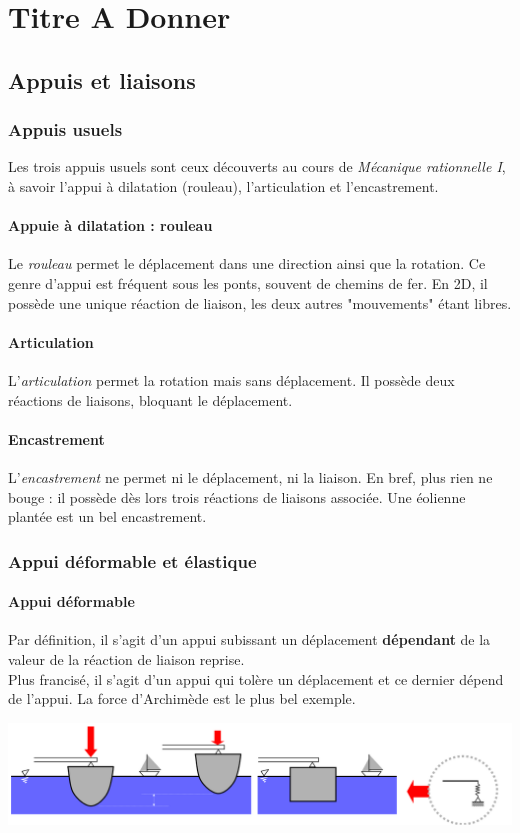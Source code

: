 \chapter{Titre  A Donner}
\section{Appuis et liaisons}
	\subsection{Appuis usuels}
	Les trois appuis usuels sont ceux découverts au cours de \textit{Mécanique 
	rationnelle I}, à savoir l'appui à dilatation (rouleau), l'articulation et 
	l'encastrement.
	
		\subsubsection{Appuie à dilatation : rouleau}
		Le \textit{rouleau} permet le déplacement dans une direction ainsi que 
		la rotation. Ce genre d'appui est fréquent sous les ponts, souvent de 
		chemins de fer. En 2D, il possède une unique réaction de liaison, les 
		deux autres "mouvements" étant libres.
		
		\subsubsection{Articulation}
		L'\textit{articulation} permet la rotation mais sans déplacement. Il 
		possède deux réactions de liaisons, bloquant le déplacement.
		
		\subsubsection{Encastrement}
		L'\textit{encastrement} ne permet ni le déplacement, ni la liaison. En 
		bref, plus rien ne bouge : il possède dès lors trois réactions de 
		liaisons associée. Une éolienne plantée est un bel encastrement.
	
	\subsection{Appui déformable et élastique}
		\subsubsection{Appui déformable}
		Par définition, il s'agit d'un appui subissant un déplacement 
		\textbf{dépendant} 	de la valeur de la réaction de liaison reprise. \\
		Plus francisé, il s'agit d'un appui qui tolère un déplacement et 
		ce dernier dépend de l'appui. La force d'Archimède est le plus bel 
		exemple.
		\begin{center}
		\includegraphics[scale=0.26]{ch2/image4}
		\end{center}\newpage
